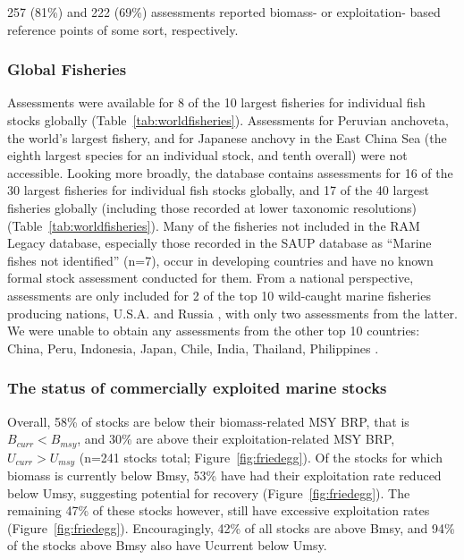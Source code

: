 257 (81\%) and
222 (69\%)
assessments reported biomass- or exploitation- based reference points
of some sort, respectively. 


\subsubsection*{Global Fisheries}
Assessments were available for 8 of the 10 largest fisheries for
individual fish stocks globally (Table~\ref{tab:worldfisheries}). Assessments for Peruvian
anchoveta, the world's largest fishery, and for Japanese anchovy in
the East China Sea (the eighth largest species for an individual
stock, and tenth overall) were not accessible. Looking more broadly,
the database contains assessments for 16 of the 30 largest fisheries
for individual fish stocks globally, and 17 of the 40 largest
fisheries globally (including those recorded at lower taxonomic
resolutions) (Table~\ref{tab:worldfisheries}). Many of the fisheries not included in the RAM
Legacy database, especially those recorded in the SAUP database as
``Marine fishes not identified'' (n=7), occur in developing countries
and have no known formal stock assessment conducted for them.  From a
national perspective, assessments are only included for 2 of the top
10 wild-caught marine fisheries producing nations, U.S.A. and Russia
\citep{FAO:sofia}, with only two assessments from the latter. We were unable
to obtain any assessments from the other top 10 countries: China,
Peru, Indonesia, Japan, Chile, India, Thailand, Philippines \citep{FAO:sofia}.

\subsubsection*{The status of commercially exploited marine stocks }
Overall, 58\% of stocks are below
their biomass-related MSY BRP, that is $B_{curr}<B_{msy}$, and
30\% are above their
exploitation-related MSY BRP, $U_{curr}>U_{msy}$
(n=241 stocks total; Figure~\ref{fig:friedegg}).
Of the stocks for which biomass is currently below Bmsy,
53\% have had their
exploitation rate reduced below Umsy, suggesting potential for
recovery (Figure~\ref{fig:friedegg}). The remaining
47\% of these stocks however,
still have excessive exploitation rates (Figure~\ref{fig:friedegg}).
Encouragingly, 42\% of all stocks are
above Bmsy, and 94\% of the
stocks above Bmsy also have Ucurrent below Umsy. 


